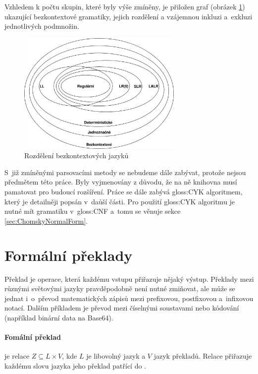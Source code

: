 		\vfill
			
		Vzhledem k počtu skupin, které byly výše zmíněny, je přiložen graf (obrázek \ref{pic:contextfreeLanguages}) ukazující bezkontextové gramatiky, jejich rozdělení a vzájemnou inkluzi a~exkluzi jednotlivých podmnožin.
		
		\begin{figure}[h]
			\centering
			\includegraphics[width=8cm]{img/ContextFreeLanguageGroups}
			\caption{Rozdělení bezkontextových jazyků}
			\label{pic:contextfreeLanguages}
		\end{figure}
		
		S~již zmíněnými parsovacími metody se nebudeme dále zabývat, protože nejsou předmětem této práce. Byly vyjmenovány z důvodu, že na ně knihovna musí pamatovat pro budoucí rozšíření. Práce se dále zabývá \gls{gloss:CYK} algoritmem, který je detailněji popsán v~daůší části. Pro použití \gls{gloss:CYK} algoritmu je nutné mít gramatiku v~\gls{gloss:CNF} a~tomu se věnuje sekce \ref{sec:ChomskyNormalForm}.
		
	\section{Formální překlady}
		Překlad \cite{Aho:1969:TCF:800169.805425} je operace, která každému vstupu přiřazuje nějaký výstup. Překlady mezi různými světovými jazyky pravděpodobně není nutné zmiňovat, ale může se jednat i~o~převod matematických zápisů mezi prefixovou, postfixovou a~infixovou notací. Dalším příkladem je převod mezi číselnými soustavami nebo kódování (například binární data na Base64).
		
		\paragraph{Fomální překlad}
		je relace $Z\subseteq L\times V$, kde $L$ je libovolný jazyk a $V$ jazyk překladů. Relace přiřazuje každému slovu jazyka  jeho překlad patřící do .
